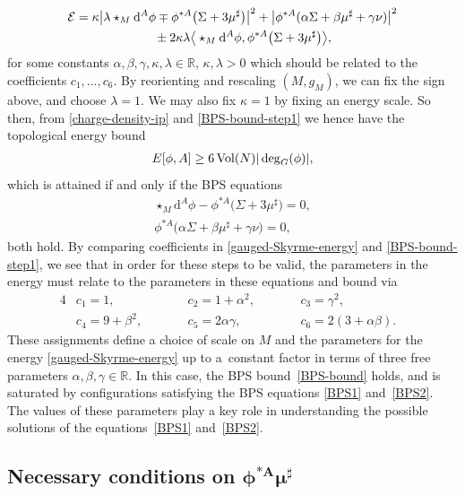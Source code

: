 \documentclass[pdftex]{sigma}
\newcommand{\EE}{{\mathcal{E}}}
\newcommand{\R}{{\mathbb{R}}}
\newcommand{\1}{{\mathbb{1}}}
\def \d{\mathrm{d}}
\numberwithin{equation}{section}
\begin{document}
\begin{gather}\label{BPS-bound-step1}
\EE=\kappa\big|\lambda\star_{M}\d^A\phi\mp\phi^{\ast A}\big(\Sigma+3\mu^\sharp\big)\big|^2
 +\big|\phi^{\ast A}(\alpha\Sigma+\beta\mu^\sharp+\gamma\nu)\big|^2\\\nonumber
 \hphantom{\EE=}{}\pm2\kappa\lambda\big\langle \star_{M}\d^A\phi,\phi^{\ast A}\big(\Sigma+3\mu^\sharp\big)\big\rangle ,
\end{gather}
for some constants $\alpha, \beta, \gamma, \kappa, \lambda\in\R$, $\kappa, \lambda>0$ which should be related to the coefficients $c_1,\dots,c_6$. By reorienting and rescaling $(M,g_M)$, we can fix the sign above, and choose $\lambda=1$. We may also fix $\kappa=1$ by fixing an energy scale. So then, from \eqref{charge-density-ip} and \eqref{BPS-bound-step1} we hence have the topological energy bound
\begin{align}
 E[\phi,A]\geq6\,{\rm Vol}(N) |\deg_G(\phi) |,\label{BPS-bound}
\end{align}
which is attained if and only if the BPS equations
\begin{gather}
 \star_{M}\d^A\phi-\phi^{\ast A}\big(\Sigma+3\mu^\sharp\big)=0,\label{BPS1}\\
 \phi^{\ast A}\big(\alpha\Sigma+\beta\mu^\sharp+\gamma\nu\big)=0,\label{BPS2}
\end{gather}
both hold. By comparing coefficients in \eqref{gauged-Skyrme-energy} and \eqref{BPS-bound-step1}, we see that in order for these steps to be valid, the parameters in the energy must relate to the parameters in these equations and bound via{\samepage
\begin{alignat}{4}
 & c_1=1,\qquad && c_2=1+\alpha^2,\qquad&& c_3 =\gamma^2,&\nonumber\\
 & c_4=9+\beta^2,\qquad && c_5 =2\alpha\gamma,\qquad&& c_6 =2(3+\alpha\beta).& \label{parameter-matching}
 \end{alignat}}%
These assignments define a choice of scale on $M$ and the parameters for the energy \eqref{gauged-Skyrme-energy} up to a~constant factor in terms of three free parameters $\alpha, \beta,\gamma\in\R$. In this case, the BPS bound~\eqref{BPS-bound} holds, and is saturated by configurations satisfying the BPS equations \eqref{BPS1} and~\eqref{BPS2}.
The values of these parameters play a key role in understanding the possible solutions of the equations~\eqref{BPS1} and~\eqref{BPS2}.

\subsection[Necessary conditions on the pullback of the moment map]{Necessary conditions on $\boldsymbol{\phi^{\ast A}\mu^\sharp}$}\label{sec:nec-cond-BPS1}
\end{document}
